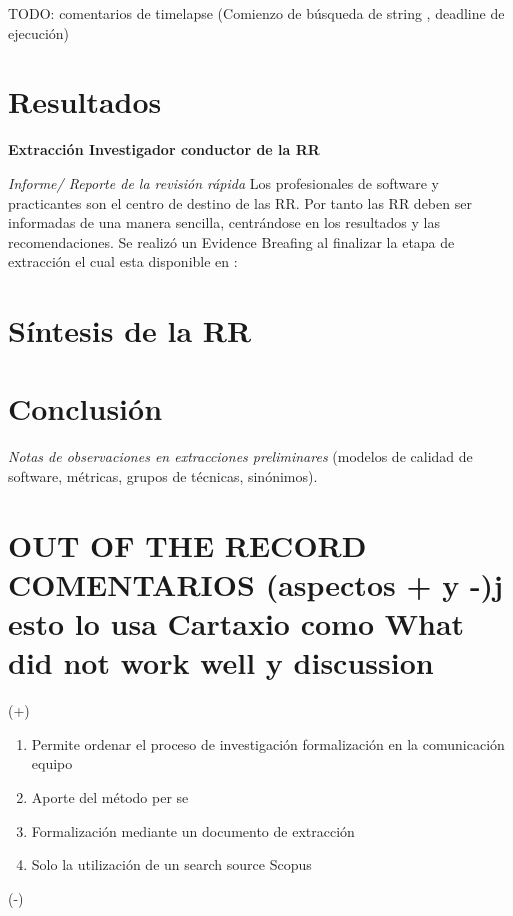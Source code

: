 \documentclass[conference]{IEEEtran}
\begin{document}
TODO: comentarios de timelapse (Comienzo de búsqueda de string , deadline de ejecución)

\section{Resultados}


\textbf{Extracción Investigador conductor de la RR}



\textit{ Informe/ Reporte de la  revisión rápida}
 Los profesionales de software y practicantes son el centro de  destino de las RR. Por tanto las RR deben ser informadas de una manera sencilla, centrándose en los resultados y las recomendaciones. Se realizó un Evidence Breafing \cite{cartaxo2016evidence} al finalizar la etapa de extracción el cual esta disponible en : 


\section{Síntesis de la RR}


\section{Conclusión}

\textit{Notas de observaciones en  extracciones preliminares}
(modelos de calidad de software, métricas, grupos de técnicas,
sinónimos).


\section{OUT OF THE RECORD COMENTARIOS (aspectos + y -)j esto lo usa Cartaxio como What did not work well y discussion}
(+)
\begin{enumerate}
\item Permite ordenar el proceso de investigación formalización en la comunicación equipo
\item Aporte del método per se
\item Formalización mediante un documento de extracción 
\item Solo la utilización de un search source Scopus
\end{enumerate}


(-)
\end{document}
